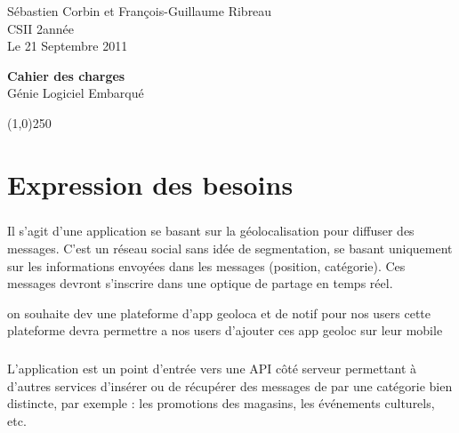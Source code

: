 \documentclass[a4paper,12pt]{report}
\begin{document}
	\begin{onehalfspace}

    \begin{titlepage}
      \begin{center}
        Sébastien Corbin et François-Guillaume Ribreau\\
        CSII 2\ieme année\\
    		Le 21 Septembre 2011\\
      \end{center}
      \hrulefill
      \vspace{7cm}
      \begin{center}
        \LARGE \textbf{Cahier des charges}\\
        \vspace{3cm}
        \normalsize Génie Logiciel Embarqué
      \end{center}

      \vspace{9,5cm}

      \begin{center}
      \line(1,0){250}
      \end{center}

      \begin{center}
      \tiny{\currfilename}
      \end{center}


    \end{titlepage}
    \clearpage

  \thispagestyle{empty}
  \setcounter{page}{0}
  \clearpage

	\chapter*{Expression des besoins}
	\paragraph*{}
	Il s'agit d'une application se basant sur la géolocalisation pour diffuser des messages. C'est un réseau social sans idée de segmentation, se basant uniquement sur les informations envoyées dans les messages (position, catégorie). Ces messages devront s'inscrire dans une optique de partage en temps réel.
	
	on souhaite dev une plateforme d'app geoloca et de notif pour nos users
	cette plateforme devra permettre a nos users d'ajouter ces app geoloc sur leur mobile
	
	\paragraph*{}
	L'application est un point d'entrée vers une API côté serveur permettant à d'autres services d'insérer ou de récupérer des messages de par une catégorie bien distincte, par exemple : les promotions des magasins, les événements culturels, etc.


\end{onehalfspace}
\end{document}

